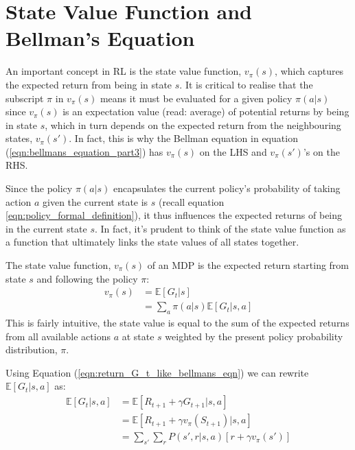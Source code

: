 \documentclass[a4paper,11pt]{article}
\begin{document}
\section{State Value Function and Bellman's Equation}

An important concept in RL is the state value function, $v_{\pi}(s)$, which captures the expected return from being in state $s$.  It is critical to realise that the subscript $\pi$ in $v_{\pi}(s)$ means it must be evaluated for a given policy $\pi(a|s)$ since $v_{\pi}(s)$ is an expectation value (read: average) of potential returns by being in state $s$, which in turn depends on the expected return from the neighbouring states, $v_{\pi}(s')$.  In fact, this is why the Bellman equation in equation (\ref{eqn:bellmans_equation_part3}) has $v_{\pi}(s)$ on the LHS and $v_{\pi}(s')$'s on the RHS.

Since the policy $\pi(a|s)$ encapsulates the current policy's probability of taking action $a$ given the current state is $s$ (recall equation \ref{eqn:policy_formal_definition}), it thus influences the expected returns of being in the current state $s$.  In fact, it's prudent to think of the state value function as a function that ultimately links the state values of all states together.

The state value function, $v_{\pi}(s)$ of an MDP is the expected return starting from state $s$ and following the policy $\pi$:
\begin{equation} \label{eqn:bellmans_equation_part1}
\begin{split}
        v_\pi (s) &= \mathbb{E}[G_t|s] \\
        &= \sum_{a} \pi(a|s) \mathbb{E} [G_t|s,a]
\end{split}
\end{equation}
This is fairly intuitive, the state value is equal to the sum of the expected returns from all available actions $a$ at state $s$ weighted by the present policy probability distribution, $\pi$.

Using Equation (\ref{eqn:return_G_t_like_bellmans_eqn}) we can rewrite $\mathbb{E} [G_t|s, a]$ as:
\begin{equation} \label{eqn:bellmans_equation_part2}
\begin{split}
        \mathbb{E} [G_t|s, a] &= \mathbb{E} [R_{t+1} + \gamma G_{t+1}|s, a] \\
        &= \mathbb{E} [R_{t+1} + \gamma v_\pi(S_{t+1})|s, a] \\
        &= \sum_{s'} \sum_r P(s',r|s,a) [r + \gamma v_{\pi}(s')]
\end{split}
\end{equation}
\end{document}

